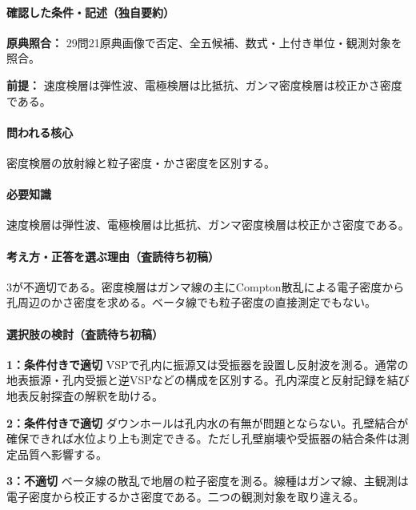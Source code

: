 \paragraph{確認した条件・記述（独自要約）}\mbox{}\par

\noindent\textbf{原典照合：} 29問21原典画像で否定、全五候補、数式・上付き単位・観測対象を照合。\par

\noindent\textbf{前提：} 速度検層は弾性波、電極検層は比抵抗、ガンマ密度検層は校正かさ密度である。\par

\paragraph{問われる核心} 密度検層の放射線と粒子密度・かさ密度を区別する。

\paragraph{必要知識} 速度検層は弾性波、電極検層は比抵抗、ガンマ密度検層は校正かさ密度である。

\paragraph{考え方・正答を選ぶ理由（査読待ち初稿）} 3が不適切である。密度検層はガンマ線の主にCompton散乱による電子密度から孔周辺のかさ密度を求める。ベータ線でも粒子密度の直接測定でもない。

\paragraph{選択肢の検討（査読待ち初稿）}\mbox{}\par

\noindent\textbf{1：条件付きで適切} VSPで孔内に振源又は受振器を設置し反射波を測る。通常の地表振源・孔内受振と逆VSPなどの構成を区別する。孔内深度と反射記録を結び地表反射探査の解釈を助ける。\par

\noindent\textbf{2：条件付きで適切} ダウンホールは孔内水の有無が問題とならない。孔壁結合が確保できれば水位より上も測定できる。ただし孔壁崩壊や受振器の結合条件は測定品質へ影響する。\par

\noindent\textbf{3：不適切} ベータ線の散乱で地層の粒子密度を測る。線種はガンマ線、主観測は電子密度から校正するかさ密度である。二つの観測対象を取り違える。\par

